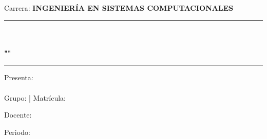 \begin{titlepage}
\begin{center}
        \vspace{0.8cm}
        \large
        Carrera: \textbf{INGENIERÍA EN SISTEMAS COMPUTACIONALES}
        
        \vspace{0.8cm}
        \begin{center}
            \rule{\textwidth}{0.5pt} \\[0.4cm]
            \textit{\descripcion} \\ [0.4cm]
            \textbf{"\myActivity"} \\[0.4cm]
            \rule{\textwidth}{0.5pt}
        \end{center}
        \vspace{0.4cm}


        \vspace{0.8cm}
        \begin{minipage}{0.48\textwidth}
            \begin{flushleft}
                {\large
                    Presenta:\\    
                    \textbf{\authora}\\
                    Grupo: \textbf{\myGroup} | Matrícula: \textbf{\myControlNumber}
                }
            \end{flushleft}
        \end{minipage}
        \hfill
        \begin{minipage}{0.48\textwidth}
            \begin{flushright}
                {\large
                    Docente:\\
                    \textbf{\myReviewers}
                }
            \end{flushright}
        \end{minipage}
        
        \vfill
        
        {\large Periodo: \myPeriod}\\
        \vspace{0.3cm}
        {\large \myDate}
        
    \end{center}
\end{titlepage}
